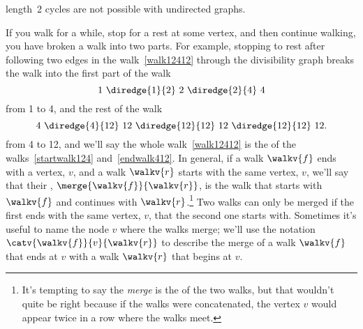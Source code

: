 \begin{editingnotes}
length~2 cycles are not possible with undirected graphs.
\end{editingnotes}

If you walk for a while, stop for a rest at some vertex, and then
continue walking, you have broken a walk into two parts.  For example,
stopping to rest after following two edges in the walk~\eqref{walk12412}
through the divisibility graph breaks the walk into the first part of the walk
\begin{equation}\label{startwalk124}
1\ \diredge{1}{2}\  2\  \diredge{2}{4}\  4
\end{equation}
from 1 to 4, and the rest of the walk
\begin{equation}\label{endwalk412}
4\ \diredge{4}{12}\  12\  \diredge{12}{12}\  12\ \diredge{12}{12}\  12.
\end{equation}
from 4 to 12, and we'll say the whole walk~\eqref{walk12412} is the
 of the walks~\eqref{startwalk124} and~\eqref{endwalk412}.
In general, if a walk $\walkv{f}$ ends with a vertex, $v$, and a walk
$\walkv{r}$ starts with the same vertex, $v$, we'll say that their
, $\merge{\walkv{f}}{\walkv{r}}$, is the walk that starts
with $\walkv{f}$ and continues with $\walkv{r}$.\footnote{It's
  tempting to say the \emph{merge} is the  of the
  two walks, but that wouldn't quite be right because if the walks
  were concatenated, the vertex $v$ would appear twice in a row where
  the walks meet.}  Two walks can only be merged if the first ends
with the same vertex, $v$, that the second one starts with.  Sometimes
it's useful to name the node $v$ where the walks merge; we'll use the
notation $\catv{\walkv{f}}{v}{\walkv{r}}$ to describe the merge of a
walk $\walkv{f}$ that ends at $v$ with a walk $\walkv{r}$ that begins
at $v$.

\iffalse
 Here's a precise definition:
\begin{definition}
If a walk $\walkv{f}$ ends at a vertex $v$ and a walk $\walkv{r}$
begins at the same vertex $v$, then the \term{$v$-merge} of
$\walkv{f}$ with $\walkv{r}$, written,
\[
\catv{\walkv{f}}{v}{\walkv{r}},
\]
is the walk whose vertex sequence is the vertex sequence of
$\walkv{f}$ concatenated with the vertex sequence of $\walkv{r}$
without its initial $v$.  That is, if
\begin{align*}
\walkv{r} & = v\,\vec{\alpha},
\end{align*}
for some finite sequence $\vec{\alpha}$ of vertices,
then
\[
\catv{\walkv{f}}{v}{\walkv{r}} \eqdef  \walkv{f}\alpha.
\]
\end{definition}
\fi


